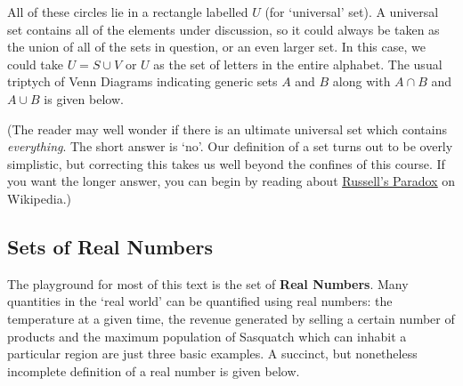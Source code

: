 \medskip

All of these circles lie in a rectangle labelled $U$ (for `universal' set).  A universal set contains all of the elements under discussion, so it could always be taken as the union of all of the sets in question, or an even larger set.  In this case, we could take $U = S \cup V$ or $U$ as the set of letters in the entire alphabet.    The usual triptych of Venn Diagrams indicating generic sets $A$ and  $B$ along with $A \cap B$ and $A \cup B$ is given below.

(The reader may well wonder if there is an ultimate universal set which contains \textit{everything}.  The short answer is `no'. Our definition of a set turns out to be overly simplistic, but correcting this takes us well beyond the confines of this course. If you want the longer answer, you can begin by reading about \href{http://en.wikipedia.org/wiki/Russell's_paradox}{\underline{Russell's Paradox}} on Wikipedia.)


\subsection{Sets of Real Numbers}
\label{SetsofNumbers}

The playground for most of this text is the set of \textbf{Real Numbers}.  Many quantities in the `real world' can be quantified using real numbers: the temperature at a given time, the revenue generated by selling a certain number of products and the maximum population of Sasquatch which can inhabit a particular region are just three basic examples.   A succinct, but nonetheless incomplete definition of a real number is given below.

\medskip



